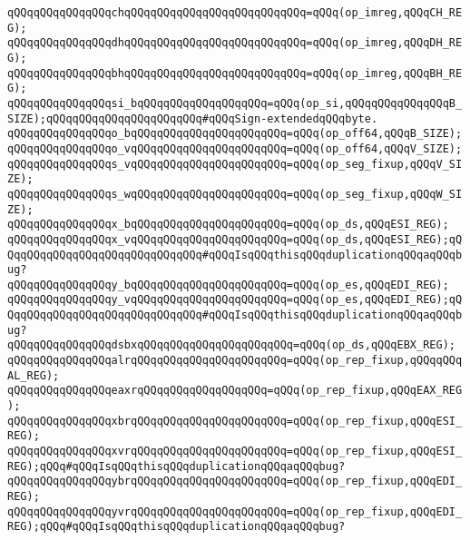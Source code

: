\verb|qQQqqQQqqQQqqQQqchqQQqqQQqqQQqqQQqqQQqqQQqqQQq=qQQq(op_imreg,qQQqCH_REG);|\newline
\verb|qQQqqQQqqQQqqQQqdhqQQqqQQqqQQqqQQqqQQqqQQqqQQq=qQQq(op_imreg,qQQqDH_REG);|\newline
\verb|qQQqqQQqqQQqqQQqbhqQQqqQQqqQQqqQQqqQQqqQQqqQQq=qQQq(op_imreg,qQQqBH_REG);|\newline
\verb|qQQqqQQqqQQqqQQqsi_bqQQqqQQqqQQqqQQqqQQq=qQQq(op_si,qQQqqQQqqQQqqQQqB_SIZE);qQQqqQQqqQQqqQQqqQQqqQQq#qQQqSign-extendedqQQqbyte.|\newline
\verb|qQQqqQQqqQQqqQQqo_bqQQqqQQqqQQqqQQqqQQqqQQq=qQQq(op_off64,qQQqB_SIZE);|\newline
\verb|qQQqqQQqqQQqqQQqo_vqQQqqQQqqQQqqQQqqQQqqQQq=qQQq(op_off64,qQQqV_SIZE);|\newline
\verb|qQQqqQQqqQQqqQQqs_vqQQqqQQqqQQqqQQqqQQqqQQq=qQQq(op_seg_fixup,qQQqV_SIZE);|\newline
\verb|qQQqqQQqqQQqqQQqs_wqQQqqQQqqQQqqQQqqQQqqQQq=qQQq(op_seg_fixup,qQQqW_SIZE);|\newline
\verb|qQQqqQQqqQQqqQQqx_bqQQqqQQqqQQqqQQqqQQqqQQq=qQQq(op_ds,qQQqESI_REG);|\newline
\verb|qQQqqQQqqQQqqQQqx_vqQQqqQQqqQQqqQQqqQQqqQQq=qQQq(op_ds,qQQqESI_REG);qQQqqQQqqQQqqQQqqQQqqQQqqQQqqQQq#qQQqIsqQQqthisqQQqduplicationqQQqaqQQqbug?|\newline
\verb|qQQqqQQqqQQqqQQqy_bqQQqqQQqqQQqqQQqqQQqqQQq=qQQq(op_es,qQQqEDI_REG);|\newline
\verb|qQQqqQQqqQQqqQQqy_vqQQqqQQqqQQqqQQqqQQqqQQq=qQQq(op_es,qQQqEDI_REG);qQQqqQQqqQQqqQQqqQQqqQQqqQQqqQQq#qQQqIsqQQqthisqQQqduplicationqQQqaqQQqbug?|\newline
\verb|qQQqqQQqqQQqqQQqdsbxqQQqqQQqqQQqqQQqqQQqqQQq=qQQq(op_ds,qQQqEBX_REG);|\newline
\verb|qQQqqQQqqQQqqQQqalrqQQqqQQqqQQqqQQqqQQqqQQq=qQQq(op_rep_fixup,qQQqqQQqAL_REG);|\newline
\verb|qQQqqQQqqQQqqQQqeaxrqQQqqQQqqQQqqQQqqQQq=qQQq(op_rep_fixup,qQQqEAX_REG);|\newline
\verb|qQQqqQQqqQQqqQQqxbrqQQqqQQqqQQqqQQqqQQqqQQq=qQQq(op_rep_fixup,qQQqESI_REG);|\newline
\verb|qQQqqQQqqQQqqQQqxvrqQQqqQQqqQQqqQQqqQQqqQQq=qQQq(op_rep_fixup,qQQqESI_REG);qQQq#qQQqIsqQQqthisqQQqduplicationqQQqaqQQqbug?|\newline
\verb|qQQqqQQqqQQqqQQqybrqQQqqQQqqQQqqQQqqQQqqQQq=qQQq(op_rep_fixup,qQQqEDI_REG);|\newline
\verb|qQQqqQQqqQQqqQQqyvrqQQqqQQqqQQqqQQqqQQqqQQq=qQQq(op_rep_fixup,qQQqEDI_REG);qQQq#qQQqIsqQQqthisqQQqduplicationqQQqaqQQqbug?|\newline
